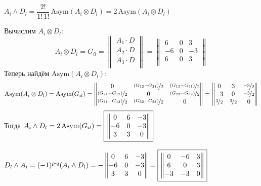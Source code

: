 \documentclass{article}
\newcommand*\squared[1]{\tikz[baseline=(char.base)]{
            \node[shape=rectangle,draw,inner sep=4pt] (char) {#1};}}
\begin{document}
\pagebreak
\begin{center}
$A_i \wedge D_l = \dfrac{2!}{1!\,1!}\,\text{Asym}(A_i\otimes D_l) = 2\,\text{Asym}(A_i\otimes D_l)$
\end{center}
Вычислим $A_i\otimes D_l$:
$$A_i\otimes D_l = G_{il} = \begin{Vmatrix}
A_1 \cdot D \\
A_2 \cdot D \\
A_3 \cdot D \\
\end{Vmatrix} = \begin{Vmatrix}
6 & 0 & 3 \\
-6 & 0 & -3 \\
6 & 0 & 3 \\
\end{Vmatrix}$$
Теперь найдём $\text{Asym}(A_i\otimes D_l)$:
$$\text{Asym}(A_i\otimes D_l) = \text{Asym}(G_{il}) = \begin{Vmatrix}
0 & \nicefrac{(G_{12} - G_{21})}{2} & \nicefrac{(G_{13} - G_{31})}{2} \\
\nicefrac{(G_{21} - G_{12})}{2} & 0 & \nicefrac{(G_{23} - G_{32})}{2} \\
\nicefrac{(G_{31} - G_{13})}{2} & \nicefrac{(G_{32} - G_{23})}{2} & 0
\end{Vmatrix} = \begin{Vmatrix}
0 & 3 & \nicefrac{-3}{2} \\
-3 & 0 & \nicefrac{-3}{2} \\
\nicefrac{3}{2} & \nicefrac{3}{2} & 0
\end{Vmatrix}$$
Тогда $A_i \wedge D_l = 2\,\text{Asym}(G_{il}) = \squared{$\begin{Vmatrix}
0 & 6 & -3 \\
-6 & 0 & -3 \\
3 & 3 & 0
\end{Vmatrix}$}$
\, \\
\begin{center}
$D_l \wedge A_i = (-1)^{p\cdot q}(A_i \wedge D_l) = - \begin{Vmatrix}
0 & 6 & -3 \\
-6 & 0 & -3 \\
3 & 3 & 0
\end{Vmatrix} = \squared{$\begin{Vmatrix}
0 & -6 & 3 \\
6 & 0 & 3 \\
-3 & -3 & 0
\end{Vmatrix}$}$
\end{center}
\, \\ \, \\
\end{document}
